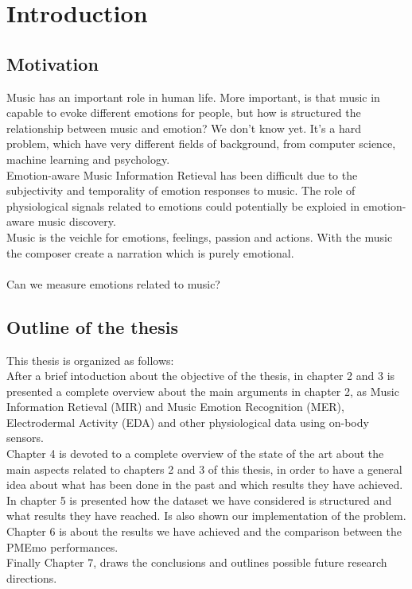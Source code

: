 \chapter{Introduction}
\label{Introduction}
\thispagestyle{plain}

\vspace{0.5cm}

\section{Motivation}
\indent
Music has an important role in human life. More important, is that music in capable to evoke different emotions for people, but how is structured the relationship between music and emotion? We don't know yet. It's a hard problem, which have very different fields of background, from computer science, machine learning and psychology.
\\ \indent
Emotion-aware Music Information Retieval has been difficult due to the subjectivity and temporality of emotion responses to music. The role of physiological signals related to emotions could potentially be exploied in emotion-aware music discovery.
\\ \indent
Music is the veichle for emotions, feelings, passion and actions. With the music the composer create a narration which is purely emotional.
\\ \\
Can we measure emotions related to music?

\section{Outline of the thesis}
This thesis is organized as follows:
\\ \indent
After a brief intoduction about the objective of the thesis, in chapter 2 and 3 is presented a complete overview about the main arguments in chapter 2, as Music Information Retieval (MIR) and Music Emotion Recognition (MER), Electrodermal Activity (EDA) and other physiological data using on-body sensors.
\\ \indent
Chapter 4 is devoted to a complete overview of the state of the art about the main aspects related to chapters 2 and 3 of this thesis, in order to have a general idea about what has been done in the past and which results they have achieved.
\\ \indent
In chapter 5 is presented how the dataset we have considered is structured and what results they have reached. Is also shown our implementation of the problem.
\\ \indent
Chapter 6 is about the results we have achieved and the comparison between the PMEmo performances.
\\ \indent
Finally Chapter 7, draws the conclusions and outlines possible future research directions.


